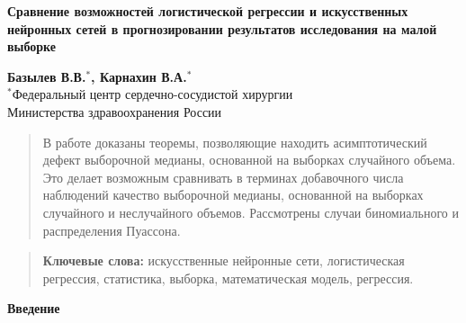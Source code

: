 \documentclass[a4paper,twoside]{article}
\newcommand{\firstheader}[1]{\noindent\textbf{#1}\nopagebreak\bigskip}
\theoremstyle{theorem}
\theoremstyle{remark}
\begin{document}
\pagestyle{headings}
\makeatletter

\begin{center}
{\bf Сравнение возможностей логистической регрессии и искусственных нейронных сетей в прогнозировании результатов исследования на малой выборке}
\vspace{4mm}\par
{\bf Базылев В.В.$^{*}$, Карнахин В.А.$^{*}$}\\
$^{*}$Федеральный центр сердечно-сосудистой хирургии \\ 
Министерства здравоохранения России\\
\end{center}
\vspace{2mm}\par

\begin{quote}
В работе доказаны теоремы, позволяющие находить асимптотический дефект выборочной медианы, основанной на выборках случайного объема. Это делает возможным сравнивать в терминах добавочного числа наблюдений качество выборочной медианы, основанной на выборках случайного и неслучайного объемов. Рассмотрены случаи биномиального и распределения Пуассона.
\end{quote}

\begin{quote}
{\bf Ключевые слова:} искусственные нейронные сети, логистическая регрессия, статистика,
выборка, математическая модель, регрессия.
\end{quote}




\firstheader{Введение}
\end{document}
